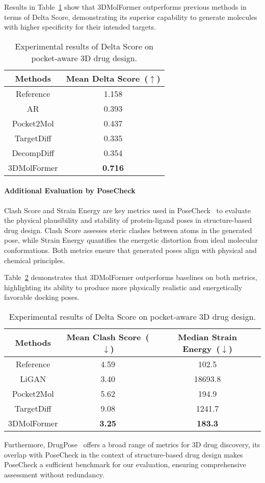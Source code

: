 Results in Table~\ref{DeltaScore-results} show that 3DMolFormer outperforms previous methods in terms of Delta Score, demonstrating its superior capability to generate molecules with higher specificity for their intended targets.

\begin{table}[ht]
\caption{Experimental results of Delta Score on pocket-aware 3D drug design.}
\label{DeltaScore-results}
\begin{center}
\begin{tabular}{cc}
\hline
Methods & Mean Delta Score~($\uparrow$) \\ \hline
Reference & 1.158 \\ \hline
AR & 0.393 \\
Pocket2Mol & 0.437 \\
TargetDiff & 0.335 \\
DecompDiff & 0.354 \\ \hline
3DMolFormer & \textbf{0.716} \\ \hline
\end{tabular}
\end{center}
\end{table}

\paragraph{Additional Evaluation by PoseCheck}
Clash Score and Strain Energy are key metrics used in PoseCheck~\citep{PoseCheck} to evaluate the physical plausibility and stability of protein-ligand poses in structure-based drug design. Clash Score assesses steric clashes between atoms in the generated pose, while Strain Energy quantifies the energetic distortion from ideal molecular conformations. Both metrics ensure that generated poses align with physical and chemical principles.

Table~\ref{PoseCheck-results} demonstrates that 3DMolFormer outperforms baselines on both metrics, highlighting its ability to produce more physically realistic and energetically favorable docking poses.

\begin{table}[ht]
\caption{Experimental results of Delta Score on pocket-aware 3D drug design.}
\label{PoseCheck-results}
\begin{center}
\begin{tabular}{ccc}
\hline
Methods & Mean Clash Score~($\downarrow$) & Median Strain Energy~($\downarrow$) \\ \hline
Reference & 4.59 & 102.5 \\ \hline
LiGAN & 3.40 & 18693.8 \\
Pocket2Mol & 5.62 & 194.9 \\
TargetDiff & 9.08 & 1241.7 \\ \hline
3DMolFormer & \textbf{3.25} & \textbf{183.3} \\ \hline
\end{tabular}
\end{center}
\end{table}

Furthermore, DrugPose~\citep{DrugPose} offers a broad range of metrics for 3D drug discovery, its overlap with PoseCheck in the context of structure-based drug design makes PoseCheck a sufficient benchmark for our evaluation, ensuring comprehensive assessment without redundancy.
